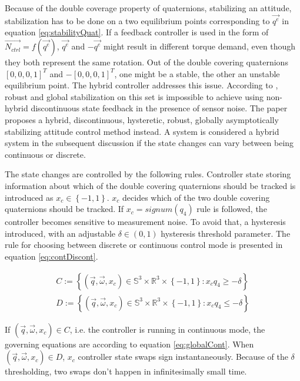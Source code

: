 Because of the double coverage property of quaternions, stabilizing an attitude, stabilization has to be done on a two equilibrium points corresponding to $\vec{q^e}$ in equation \ref{eq:stabilityQuat}. If a feedback controller is used in the form of $\vec{N_{ctrl}} = f(\vec{q^e})$, $\vec{q^e}$ and $-\vec{q^e}$ might result in different torque demand, even though they both represent the same rotation. Out of the double covering quaternions $[0, 0, 0, 1]^T$ and $-[0, 0, 0, 1]^T$, one might be a stable, the other an unstable equilibrium point. The hybrid controller addresses this issue. According to \cite{globalAttController}, robust and global stabilization on this set is impossible to achieve using non-hybrid discontinuous state feedback in the presence of sensor noise. The paper proposes a hybrid, discontinuous, hysteretic, robust, globally asymptotically stabilizing attitude control method instead. A system is considered a hybrid system in the subsequent discussion if the state changes can vary between being continuous or discrete.

The state changes are controlled by the following rules. Controller state storing information about which of the double covering quaternions should be tracked is introduced as $x_c \in  \left\lbrace -1,1 \right\rbrace $. $x_c$ decides which of the two double covering quaternions should be tracked. If $x_c = signum(q_4)$ rule is followed, the controller becomes sensitive to measurement noise. To avoid that, a hysteresis introduced, with an adjustable $\delta  \in (0,1)$ hysteresis threshold parameter. The rule for choosing between discrete or continuous control mode is presented in equation \ref{eq:contDiscont}.

\begin{align}
\label{eq:contDiscont}
C:= \left\lbrace (\vec{q},\vec{\omega},x_c) \in \mathbb{S}^3 \times \mathbb{R}^3 \times \left\lbrace -1,1 \right\rbrace : x_c q_4 \geq -\delta \right\rbrace  \\
\nonumber D:= \left\lbrace (\vec{q},\vec{\omega},x_c) \in \mathbb{S}^3 \times \mathbb{R}^3 \times \left\lbrace -1,1 \right\rbrace : x_cq_4 \leq -\delta \right\rbrace 
\end{align}

If $(\vec{q},\vec{\omega},x_c) \in C$, i.e. the controller is running in continuous mode, the governing equations are according to equation \ref{eq:globalCont}. When $(\vec{q},\vec{\omega},x_c) \in D$, $x_c$ controller state swaps sign instantaneously. Because of the $\delta$ thresholding, two swaps don't happen in infinitesimally small time.  


